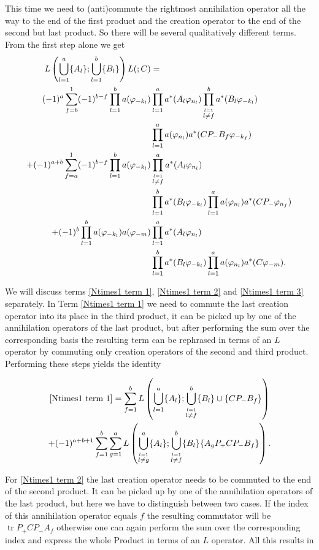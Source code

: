 \documentclass[b5paper,draft,openbib,12pt]{memoir}
\DeclareMathOperator{\tr}{tr}
\begin{document}
This time we need to (anti)commute the rightmost annihilation operator all the way to the end of the first product and the creation operator to the end of the second but last product. So there will be several qualitatively different terms. From the first step alone we get
\begin{align}\notag
L\left(\bigcup_{l=1}^a \{A_l\}; \bigcup_{l=1}^b \{B_l\}\right) L(;C)&=\\\notag
(-1)^{a}\sum_{f=b}^1 (-1)^{b-f} \prod_{l=1}^b a(\varphi_{-k_l}) &\prod_{l=1}^a a^*(A_l \varphi_{n_l}) \prod_{\stackrel{l=1}{l\neq f}}^b a^*(B_l \varphi_{-k_l})\\ \label{Ntimes1 term 1}
& \prod_{l=1}^a a(\varphi_{n_l}) a^*(C P_- B_f \varphi_{-k_f})\\\notag
+(-1)^{a+b}\sum_{f=a}^1 (-1)^{b-f} \prod_{l=1}^b a(\varphi_{-k_l}) &\prod_{\stackrel{l=1}{l\neq f}}^a a^*(A_l \varphi_{n_l})\\\label{Ntimes1 term 2}
& \prod_{l=1}^b a^*(B_l \varphi_{-k_l}) \prod_{l=1}^a a(\varphi_{n_l}) a^*(CP_- \varphi_{n_f})\\\notag
+(-1)^b\prod_{l=1}^b a(\varphi_{-k_l}) a(\varphi_{-m}) &\prod_{l=1}^a a^*(A_l \varphi_{n_l}) \\ \label{Ntimes1 term 3}
&\prod_{l=1}^b a^*(B_l \varphi_{-k_l}) \prod_{l=1}^a a(\varphi_{n_l})a^*(C \varphi_{-m}).
\end{align}

We will discuss terms \eqref{Ntimes1 term 1}, \eqref{Ntimes1 term 2} and \eqref{Ntimes1 term 3} separately. 
In Term \eqref{Ntimes1 term 1} we need to commute the last creation operator into its place in the third product,
it can be picked up by one of the annihilation operators of the last product, but after performing the sum over
the corresponding basis the resulting term can be rephrased in terms of an \(L\) operator by commuting
only creation operators of the second and third product. Performing these steps yields the identity

\begin{multline}
\eqref{Ntimes1 term 1}=\sum_{f=1}^b L\left( \bigcup_{l=1}^a \{A_l\}; \bigcup_{\stackrel{l=1}{l\neq f}}^b \{B_l\}\cup  \{CP_- B_f \}\right)\\
+(-1)^{a+b+1}\sum_{f=1}^b \sum_{g=1}^a L\left( \bigcup_{\stackrel{l=1}{l\neq g}}^a \{A_l\}; \bigcup_{\stackrel{l=1}{l\neq f}}^b \{B_l\} \{A_gP_+CP_- B_f \}\right).
\end{multline}

For \eqref{Ntimes1 term 2} the last creation operator needs to be commuted to the end of the second product. It can be picked up by 
one of the annihilation operators of the last product, but here we have to distinguish between two cases. If the index of this
annihilation operator equals \(f\) the resulting commutator will be \(\tr P_+ C P_- A_f \) otherwise one can again perform the sum
over the corresponding index and express the whole Product in terms of an \(L\) operator. All this results in 
\end{document}
